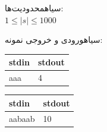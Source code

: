 ‌سیاه{محدودیت‌ها:}\\
$1\leq |s|\leq 1000$


‌سیاه{ورودی و خروجی نمونه:}\\


\begin{latin}
\begin{tabularx}{\textwidth}{|X | X|}
\hline
\textbf{stdin} &
\textbf{stdout}\\
\hline
aaa&
4\\
\hline

\end{tabularx}
\end{latin}


\begin{latin}
\begin{tabularx}{\textwidth}{|X | X|}
\hline
\textbf{stdin} &
\textbf{stdout}\\
\hline
aabaab&
10\\
\hline

\end{tabularx}
\end{latin}












